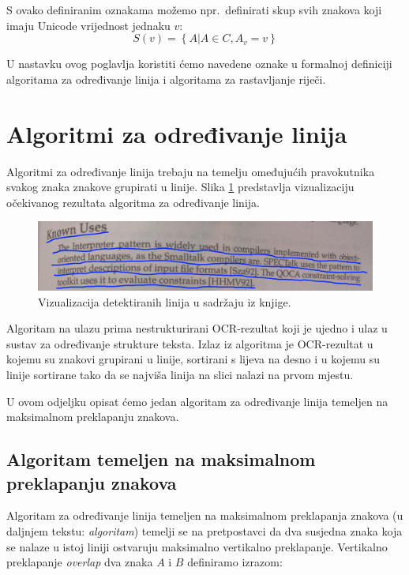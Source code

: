 \documentclass[times, utf8, zavrsni]{fer}
\begin{document}
S ovako definiranim oznakama možemo npr.\ definirati skup svih znakova koji
imaju Unicode vrijednost jednaku $v$:
\[ S(v) = \left\{A \vert A \in C, A_v = v\right\} \]

U nastavku ovog poglavlja koristiti ćemo navedene oznake u formalnoj definiciji
algoritama za određivanje linija i algoritama za rastavljanje riječi.








\section{Algoritmi za određivanje linija}
\label{sec:algoritmi-za-odredivanje-linija}
Algoritmi za određivanje linija trebaju na temelju omeđujućih pravokutnika
svakog znaka znakove grupirati u linije. Slika \ref{fig:line-semgentation-01}
predstavlja vizualizaciju očekivanog rezultata algoritma za određivanje linija.

\begin{figure}[htb]
    \centering
    \captionsetup{justification=centering,margin=2cm}
    \includegraphics[width=\textwidth]{images/line-segmentation-01.jpg}
    \caption{
        Vizualizacija detektiranih linija u sadržaju iz knjige.
    }
    \label{fig:line-semgentation-01}
\end{figure}

Algoritam na ulazu prima nestrukturirani OCR-rezultat koji je ujedno i ulaz u
sustav za određivanje strukture teksta. Izlaz iz algoritma je OCR-rezultat u
kojemu su znakovi grupirani u linije, sortirani s lijeva na desno i u kojemu
su linije sortirane tako da se najviša linija na slici nalazi na prvom mjestu.

U ovom odjeljku opisat ćemo jedan algoritam za određivanje linija temeljen
na maksimalnom preklapanju znakova.



\subsection{Algoritam temeljen na maksimalnom preklapanju znakova}
\label{subsec:algoritam-temeljen-na-maksimalnom-preklapanju-znakova}
Algoritam za određivanje linija temeljen na maksimalnom preklapanja znakova
(u daljnjem tekstu: \emph{algoritam}) temelji se na pretpostavci da dva susjedna
znaka koja se nalaze u istoj liniji ostvaruju maksimalno vertikalno preklapanje.
Vertikalno preklapanje \textit{overlap} dva znaka $A$ i $B$ definiramo izrazom:
\end{document}
